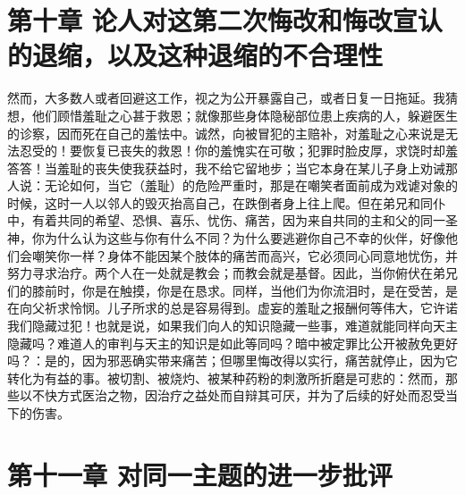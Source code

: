 
\section{第十章 论人对这第二次悔改和悔改宣认的退缩，以及这种退缩的不合理性}

然而，大多数人或者回避这工作，视之为公开暴露自己，或者日复一日拖延。我猜想，他们顾惜羞耻之心甚于救恩；就像那些身体隐秘部位患上疾病的人，躲避医生的诊察，因而死在自己的羞怯中。诚然，向被冒犯的主赔补，对羞耻之心来说是无法忍受的！要恢复已丧失的救恩！你的羞愧实在可敬；犯罪时脸皮厚，求饶时却羞答答！当羞耻的丧失使我获益时，我不给它留地步；当它本身在某儿子身上劝诫那人说：无论如何，当它（羞耻）的危险严重时，那是在嘲笑者面前成为戏谑对象的时候，这时一人以邻人的毁灭抬高自己，在跌倒者身上往上爬。但在弟兄和同仆中，有着共同的希望、恐惧、喜乐、忧伤、痛苦，因为来自共同的主和父的同一圣神，你为什么认为这些与你有什么不同？为什么要逃避你自己不幸的伙伴，好像他们会嘲笑你一样？身体不能因某个肢体的痛苦而高兴，它必须同心同意地忧伤，并努力寻求治疗。两个人在一处就是教会；而教会就是基督。因此，当你俯伏在弟兄们的膝前时，你是在触摸，你是在恳求。同样，当他们为你流泪时，是在受苦，是在向父祈求怜悯。儿子所求的总是容易得到。虚妄的羞耻之报酬何等伟大，它许诺我们隐藏过犯！也就是说，如果我们向人的知识隐藏一些事，难道就能同样向天主隐藏吗？难道人的审判与天主的知识是如此等同吗？暗中被定罪比公开被赦免更好吗？：是的，因为邪恶确实带来痛苦；但哪里悔改得以实行，痛苦就停止，因为它转化为有益的事。被切割、被烧灼、被某种药粉的刺激所折磨是可悲的：然而，那些以不快方式医治之物，因治疗之益处而自辩其可厌，并为了后续的好处而忍受当下的伤害。\par


\section{第十一章 对同一主题的进一步批评}

